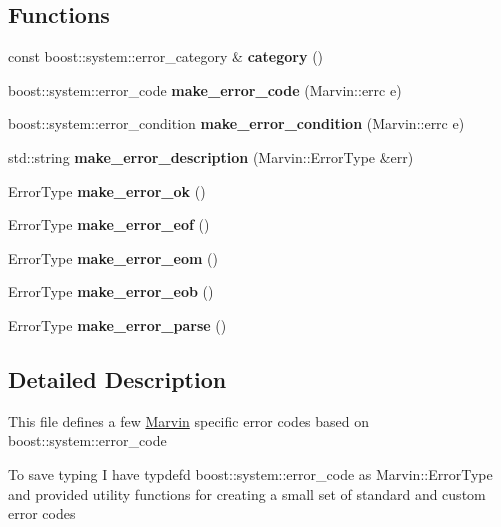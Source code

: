 \subsection*{Functions}
\begin{DoxyCompactItemize}
\item 
\mbox{\label{namespace_marvin_a02180c79ef578e07c09993bd4255a714}} 
const boost\+::system\+::error\+\_\+category \& {\bfseries category} ()
\item 
\mbox{\label{namespace_marvin_a1fa55ffb018632637e0c66cb123c1fbf}} 
boost\+::system\+::error\+\_\+code {\bfseries make\+\_\+error\+\_\+code} (Marvin\+::errc e)
\item 
\mbox{\label{namespace_marvin_ac618ba41ec18104825729624b1ca7537}} 
boost\+::system\+::error\+\_\+condition {\bfseries make\+\_\+error\+\_\+condition} (Marvin\+::errc e)
\item 
\mbox{\label{namespace_marvin_aa73927f33c6dcf4423ad684af67f669e}} 
std\+::string {\bfseries make\+\_\+error\+\_\+description} (Marvin\+::\+Error\+Type \&err)
\item 
\mbox{\label{namespace_marvin_a36f20427b5ba9b43e0a885dc096d93be}} 
Error\+Type {\bfseries make\+\_\+error\+\_\+ok} ()
\item 
\mbox{\label{namespace_marvin_a0388ace028db893c3e44a2dd93d833ca}} 
Error\+Type {\bfseries make\+\_\+error\+\_\+eof} ()
\item 
\mbox{\label{namespace_marvin_a980f5359d48110465d06c27944f549b5}} 
Error\+Type {\bfseries make\+\_\+error\+\_\+eom} ()
\item 
\mbox{\label{namespace_marvin_ae9cf6dabaf90b83744f4dbbf0918345b}} 
Error\+Type {\bfseries make\+\_\+error\+\_\+eob} ()
\item 
\mbox{\label{namespace_marvin_aca3865cf2bfbf1016b965b1dab12adf0}} 
Error\+Type {\bfseries make\+\_\+error\+\_\+parse} ()
\end{DoxyCompactItemize}


\subsection{Detailed Description}
This file defines a few \hyperlink{namespace_marvin}{Marvin} specific error codes based on boost\+::system\+::error\+\_\+code

To save typing I have typdef\textquotesingle{}d boost\+::system\+::error\+\_\+code as Marvin\+::\+Error\+Type and provided utility functions for creating a small set of standard and custom error codes 